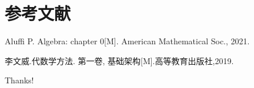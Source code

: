 \documentclass{beamer}
\begin{document}
	\section{参考文献}
	
	\begin{frame}[allowframebreaks]
		\begin{thebibliography}{10} %
			\bibitem{}
			Aluffi P. Algebra: chapter 0[M]. American Mathematical Soc., 2021.
			
			\bibitem{}
			李文威.代数学方法. 第一卷, 基础架构[M].高等教育出版社,2019.
			
		\end{thebibliography}
	\end{frame}
	
	\begin{frame}
		\begin{center}
			{\Huge\calligra Thanks!}
		\end{center}
	\end{frame}
	
\end{document}
